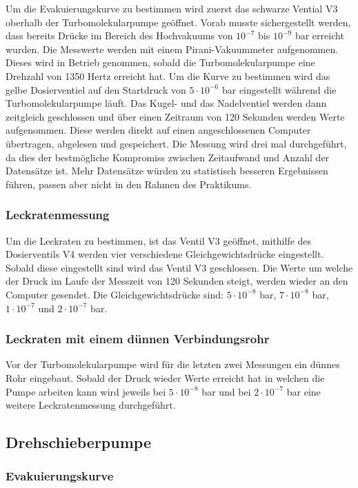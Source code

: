 Um die Evakuierungskurve zu bestimmen wird zuerst das schwarze Vential V3 oberhalb der Turbomolekularpumpe geöffnet.
Vorab musste sichergestellt werden, dass bereits Drücke im Bereich des Hochvakuums  von $10^{-7}$ bis $10^{-9}$ bar erreicht wurden.
Die Messwerte werden  mit einem Pirani-Vakuummeter aufgenommen.
Dieses wird in Betrieb genommen, sobald die Turbomolekularpumpe eine Drehzahl von 1350 Hertz erreicht hat.
Um die Kurve zu bestimmen wird das gelbe Dosierventiel auf den Startdruck von $5\cdot10^{-6}$ bar eingestellt während die Turbomolekularpumpe läuft.
Das Kugel- und das Nadelventiel werden dann zeitgleich geschlossen und über einen Zeitraum von 120 Sekunden werden Werte
aufgenommen. Diese werden direkt auf einen angeschlossenen Computer übertragen, abgelesen und gespeichert.
Die Messung wird drei mal durchgeführt, da dies der bestmögliche Kompromiss zwischen Zeitaufwand und Anzahl der Datensätze ist.
Mehr Datensätze würden zu statistisch besseren Ergebnissen führen, passen aber nicht in den Rahmen des Praktikums. 

\subsubsection{Leckratenmessung}
Um die Leckraten zu bestimmen, ist das Ventil V3 geöffnet, mithilfe des Dosierventils V4 werden vier verschiedene 
Gleichgewichtsdrücke eingestellt. Sobald diese eingestellt sind wird das Ventil V3 geschlossen. Die Werte um welche der Druck
im Laufe der Messzeit von 120 Sekunden steigt, werden wieder an den Computer gesendet. Die Gleichgewichtsdrücke sind:
$5\cdot 10^{-8}$ bar, $7\cdot 10^{-8}$ bar, $1\cdot 10^{-7}$ und $2\cdot 10^{-7}$ bar.

\subsubsection{Leckraten mit einem dünnen Verbindungsrohr}
Vor der Turbomolekularpumpe wird für die letzten zwei Messungen ein dünnes Rohr eingebaut. Sobald der Druck wieder Werte erreicht hat in 
welchen die Pumpe arbeiten kann wird jeweils bei $5\cdot 10^{-8}$ bar und bei $2\cdot 10^{-7}$ bar eine weitere Leckratenmessung durchgeführt.


\subsection{Drehschieberpumpe}
\subsubsection{Evakuierungskurve}

